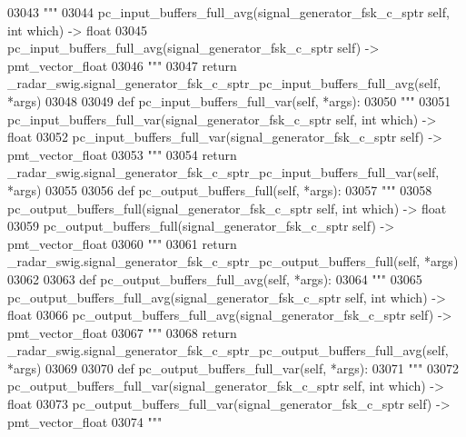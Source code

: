 \begin{DoxyCode}
{{{{{{{{{{{03043         \textcolor{stringliteral}{"""}
03044 \textcolor{stringliteral}{        pc\_input\_buffers\_full\_avg(signal\_generator\_fsk\_c\_sptr self, int which) -> float}
03045 \textcolor{stringliteral}{        pc\_input\_buffers\_full\_avg(signal\_generator\_fsk\_c\_sptr self) -> pmt\_vector\_float}
03046 \textcolor{stringliteral}{        """}
03047         \textcolor{keywordflow}{return} \_radar\_swig.signal\_generator\_fsk\_c\_sptr\_pc\_input\_buffers\_full\_avg(self, *args)
03048 
03049     \textcolor{keyword}{def }pc_input_buffers_full_var(self, *args):
03050         \textcolor{stringliteral}{"""}
03051 \textcolor{stringliteral}{        pc\_input\_buffers\_full\_var(signal\_generator\_fsk\_c\_sptr self, int which) -> float}
03052 \textcolor{stringliteral}{        pc\_input\_buffers\_full\_var(signal\_generator\_fsk\_c\_sptr self) -> pmt\_vector\_float}
03053 \textcolor{stringliteral}{        """}
03054         \textcolor{keywordflow}{return} \_radar\_swig.signal\_generator\_fsk\_c\_sptr\_pc\_input\_buffers\_full\_var(self, *args)
03055 
03056     \textcolor{keyword}{def }pc_output_buffers_full(self, *args):
03057         \textcolor{stringliteral}{"""}
03058 \textcolor{stringliteral}{        pc\_output\_buffers\_full(signal\_generator\_fsk\_c\_sptr self, int which) -> float}
03059 \textcolor{stringliteral}{        pc\_output\_buffers\_full(signal\_generator\_fsk\_c\_sptr self) -> pmt\_vector\_float}
03060 \textcolor{stringliteral}{        """}
03061         \textcolor{keywordflow}{return} \_radar\_swig.signal\_generator\_fsk\_c\_sptr\_pc\_output\_buffers\_full(self, *args)
03062 
03063     \textcolor{keyword}{def }pc_output_buffers_full_avg(self, *args):
03064         \textcolor{stringliteral}{"""}
03065 \textcolor{stringliteral}{        pc\_output\_buffers\_full\_avg(signal\_generator\_fsk\_c\_sptr self, int which) -> float}
03066 \textcolor{stringliteral}{        pc\_output\_buffers\_full\_avg(signal\_generator\_fsk\_c\_sptr self) -> pmt\_vector\_float}
03067 \textcolor{stringliteral}{        """}
03068         \textcolor{keywordflow}{return} \_radar\_swig.signal\_generator\_fsk\_c\_sptr\_pc\_output\_buffers\_full\_avg(self, *args)
03069 
03070     \textcolor{keyword}{def }pc_output_buffers_full_var(self, *args):
03071         \textcolor{stringliteral}{"""}
03072 \textcolor{stringliteral}{        pc\_output\_buffers\_full\_var(signal\_generator\_fsk\_c\_sptr self, int which) -> float}
03073 \textcolor{stringliteral}{        pc\_output\_buffers\_full\_var(signal\_generator\_fsk\_c\_sptr self) -> pmt\_vector\_float}
03074 \textcolor{stringliteral}{        """}
}}}}}}}}}}}
\end{DoxyCode}
